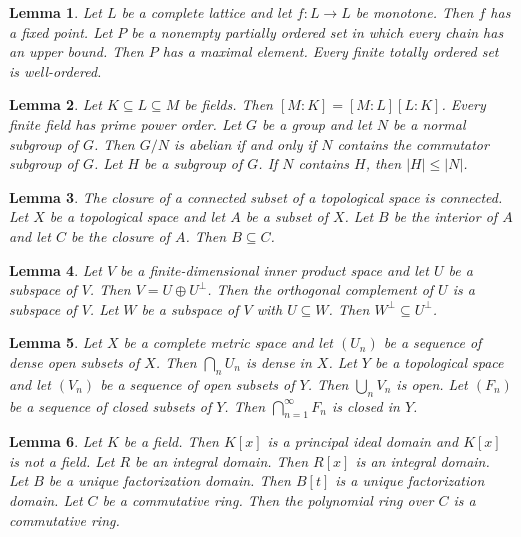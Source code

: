 \documentclass{article}
\newtheorem{lemma}{Lemma}
\begin{document}
\begin{lemma}\label{order-theory}
Let $L$ be a complete lattice and let $f\colon L\to L$ be monotone. Then $f$ has a fixed point. Let $P$ be a nonempty partially ordered set in which every chain has an upper bound. Then $P$ has a maximal element. Every finite totally ordered set is well-ordered.
\end{lemma}

\begin{lemma}\label{fields-commutators}
Let $K\subseteq L\subseteq M$ be fields. Then $[M:K]=[M:L][L:K]$. Every finite field has prime power order. Let $G$ be a group and let $N$ be a normal subgroup of $G$. Then $G/N$ is abelian if and only if $N$ contains the commutator subgroup of $G$. Let $H$ be a subgroup of $G$. If $N$ contains $H$, then $|H|\le|N|$.
\end{lemma}

\begin{lemma}\label{closures}
The closure of a connected subset of a topological space is connected. Let $X$ be a topological space and let $A$ be a subset of $X$. Let $B$ be the interior of $A$ and let $C$ be the closure of $A$. Then $B\subseteq C$.
\end{lemma}

\begin{lemma}\label{orthogonal-complements}
Let $V$ be a finite-dimensional inner product space and let $U$ be a subspace of $V$. Then $V=U\oplus U^{\perp}$. Then the orthogonal complement of $U$ is a subspace of $V$. Let $W$ be a subspace of $V$ with $U\subseteq W$. Then $W^{\perp}\subseteq U^{\perp}$.
\end{lemma}

\begin{lemma}\label{baire}
Let $X$ be a complete metric space and let $(U_n)$ be a sequence of dense open subsets of $X$. Then $\bigcap_n U_n$ is dense in $X$. Let $Y$ be a topological space and let $(V_n)$ be a sequence of open subsets of $Y$. Then $\bigcup_n V_n$ is open. Let $(F_n)$ be a sequence of closed subsets of $Y$. Then $\bigcap_{n=1}^{\infty}F_n$ is closed in $Y$.
\end{lemma}

\begin{lemma}\label{polynomial-rings}
Let $K$ be a field. Then $K[x]$ is a principal ideal domain and $K[x]$ is not a field. Let $R$ be an integral domain. Then $R[x]$ is an integral domain. Let $B$ be a unique factorization domain. Then $B[t]$ is a unique factorization domain. Let $C$ be a commutative ring. Then the polynomial ring over $C$ is a commutative ring.
\end{lemma}
\end{document}
